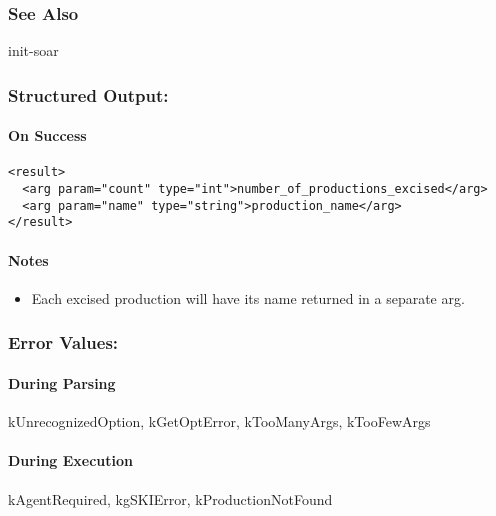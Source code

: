 \subsubsection*{See Also}
 init-soar
\subsubsection*{Structured Output:}
\paragraph*{On Success}
\begin{verbatim}
<result>
  <arg param="count" type="int">number_of_productions_excised</arg>
  <arg param="name" type="string">production_name</arg>
</result>
\end{verbatim}
\paragraph*{Notes}
\begin{itemize}
\item  Each excised production will have its name returned in a separate arg. 
\end{itemize}
\subsubsection*{Error Values:}
\paragraph*{During Parsing}
 kUnrecognizedOption, kGetOptError, kTooManyArgs, kTooFewArgs
\paragraph*{During Execution}
 kAgentRequired, kgSKIError, kProductionNotFound
